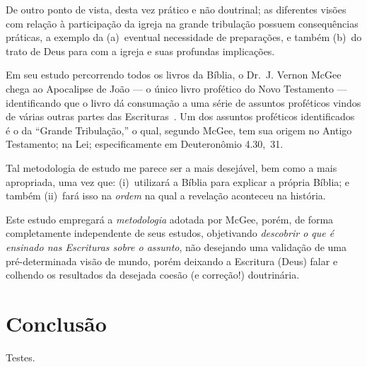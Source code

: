     De outro ponto de vista, desta vez prático e não doutrinal; as diferentes visões com relação à  participação  da  igreja  na
    grande tribulação possuem consequências práticas, a exemplo da (a)~eventual necessidade  de  preparações,  e  também  (b)~do
    trato de Deus para com a igreja e suas profundas implicações.

    Em seu estudo percorrendo todos os livros da Bíblia, o Dr.~J. Vernon McGee chega ao Apocalipse de João  ---  o  único  livro
    profético do Novo Testamento --- identificando que o livro dá consumação a uma série de assuntos proféticos vindos de várias
    outras partes das  Escrituras~\cite{ca1980-McGeeJV-49Rev}.  Um  dos  assuntos  proféticos  identificados  é  o  da  ``Grande
    Tribulação,'' o qual, segundo McGee, tem sua origem no Antigo Testamento; na Lei; especificamente em Deuteronômio 4.30,~31.

    Tal metodologia de estudo me parece ser a mais desejável, bem como a mais apropriada, uma vez que: (i)~utilizará a Bíblia
    para explicar a própria Bíblia; e também (ii)~fará isso na \emph{ordem} na qual a revelação aconteceu na história.

    Este estudo empregará a \emph{metodologia} adotada por McGee, porém, de forma completamente independente  de  seus  estudos,
    objetivando \emph{descobrir o que é  ensinado  nas  Escrituras  sobre  o  assunto},  não  desejando  uma  validação  de  uma
    pré-determinada visão de mundo, porém deixando a Escritura (Deus) falar e colhendo  os  resultados  da  desejada  coesão  (e
    correção!) doutrinária.



\section{Conclusão}

    Testes.

